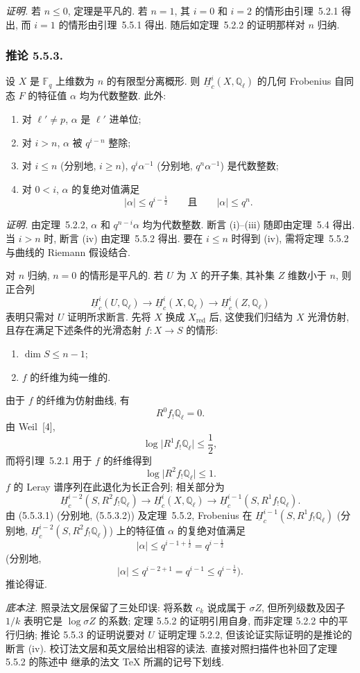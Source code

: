 \medskip
\noindent\emph{证明.}
若 $n\leq0$, 定理是平凡的. 若 $n=1$, 其 $i=0$ 和 $i=2$ 的情形由引理~5.2.1 得出,
而 $i=1$ 的情形由引理~5.5.1 得出. 随后如定理~5.2.2 的证明那样对 $n$ 归纳.

\subsubsection*{推论 5.5.3.}
设 $X$ 是 $\mathbb F_q$ 上维数为 $n$ 的有限型分离概形.
则 $\underline H_c^i(X,\mathbb Q_\ell)$ 的几何 Frobenius 自同态 $F$
的特征值 $\alpha$ 均为代数整数. 此外:
\begin{enumerate}[label=(\roman*)]
\item 对 $\ell'\ne p$, $\alpha$ 是 $\ell'$ 进单位;
\item 对 $i>n$, $\alpha$ 被 $q^{i-n}$ 整除;
\item 对 $i\leq n$ (分别地, $i\geq n$),
  $q^i\alpha^{-1}$ (分别地, $q^n\alpha^{-1}$) 是代数整数;
\item 对 $0<i$, $\alpha$ 的复绝对值满足
  \[
  |\alpha|\leq q^{i-\frac12}
  \qquad\text{且}\qquad
  |\alpha|\leq q^n.
  \]
\end{enumerate}

\medskip
\noindent\emph{证明.}
由定理~5.2.2, $\alpha$ 和 $q^{n-i}\alpha$ 均为代数整数.
断言 (i)--(iii) 随即由定理~5.4 得出. 当 $i>n$ 时, 断言 (iv) 由定理~5.5.2 得出.
要在 $i\leq n$ 时得到 (iv), 需将定理~5.5.2 与曲线的 Riemann 假设结合.

对 $n$ 归纳, $n=0$ 的情形是平凡的. 若 $U$ 为 $X$ 的开子集,
其补集 $Z$ 维数小于 $n$, 则正合列
\[
\underline H_c^i(U,\mathbb Q_\ell)\longrightarrow
\underline H_c^i(X,\mathbb Q_\ell)\longrightarrow
\underline H_c^i(Z,\mathbb Q_\ell)
\]
表明只需对 $U$ 证明所求断言. 先将 $X$ 换成 $X_{\mathrm{red}}$ 后,
这使我们归结为 $X$ 光滑仿射, 且存在满足下述条件的光滑态射 $f:X\longrightarrow S$ 的情形:
\begin{enumerate}[label=(\alph*)]
\item $\dim S\leq n-1$;
\item $f$ 的纤维为纯一维的.
\end{enumerate}
由于 $f$ 的纤维为仿射曲线, 有
\[
R^0f_!\mathbb Q_\ell=0.
\]
由 Weil~[4],
\begin{equation}\tag{5.5.3.1}
\log\bigl|R^1f_!\mathbb Q_\ell\bigr|\leq\frac12,
\end{equation}
而将引理~5.2.1 用于 $f$ 的纤维得到
\begin{equation}\tag{5.5.3.2}
\log\bigl|R^2f_!\mathbb Q_\ell\bigr|\leq1.
\end{equation}
$f$ 的 Leray 谱序列在此退化为长正合列; 相关部分为
\[
\underline H_c^{i-2}(S,R^2f_!\mathbb Q_\ell)\longrightarrow
\underline H_c^i(X,\mathbb Q_\ell)\longrightarrow
\underline H_c^{i-1}(S,R^1f_!\mathbb Q_\ell).
\]
由 (5.5.3.1) (分别地, (5.5.3.2)) 及定理~5.5.2, Frobenius 在
$\underline H_c^{i-1}(S,R^1f_!\mathbb Q_\ell)$
(分别地, $\underline H_c^{i-2}(S,R^2f_!\mathbb Q_\ell)$) 上的特征值 $\alpha$
的复绝对值满足
\[
|\alpha|\leq q^{i-1+\frac12}=q^{i-\frac12}
\]
(分别地,
\[
|\alpha|\leq q^{i-2+1}=q^{i-1}\leq q^{i-\frac12}).
\]
推论得证.

\medskip
\noindent\emph{底本注.}
照录法文层保留了三处印误: 将系数 $c_k$ 说成属于 $\sigma Z$,
但所列级数及因子 $1/k$ 表明它是 $\log\sigma Z$ 的系数;
定理 5.5.2 的证明引用自身, 而非定理 5.2.2 中的平行归纳;
推论 5.5.3 的证明说要对 $U$ 证明定理 5.2.2, 但该论证实际证明的是推论的断言 (iv).
校订法文层和英文层给出相容的读法. 直接对照扫描件也补回了定理 5.5.2 的陈述中
继承的法文 TeX 所漏的记号下划线.
